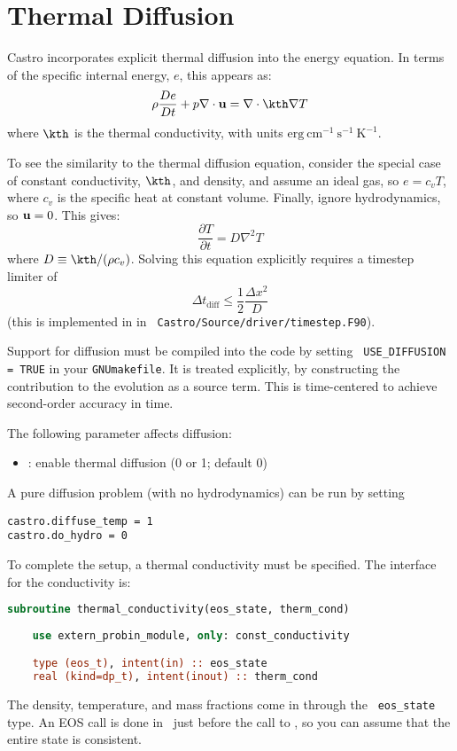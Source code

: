 \label{ch:diffusion}

\section{Thermal Diffusion}

Castro incorporates explicit thermal diffusion into the energy equation.  
In terms of the specific internal energy, $e$, this appears as:
\begin{equation}
\rho \frac{De}{Dt} + p \nabla \cdot \ub = \nabla \cdot \kth \nabla T
\end{equation}
where $\kth$ is the thermal conductivity, with units
$\mathrm{erg~cm^{-1}~s^{-1}~K^{-1}}$.

To see the similarity to the thermal diffusion equation, consider the special
case of constant conductivity, $\kth$, and density, and assume an
ideal gas, so $e = c_v T$, where $c_v$ is the specific heat at constant volume.
Finally, ignore hydrodynamics, so ${\bf u} = 0$.  This gives:
\begin{equation}
\frac{\partial T}{\partial t} = D \nabla^2 T
\end{equation}
where $D \equiv \kth/(\rho c_v)$.  Solving this equation
explicitly requires a timestep limiter of
\begin{equation}
\Delta t_\mathrm{diff} \le \frac{1}{2} \frac{\Delta x^2}{D}
\end{equation}
(this is implemented in  in {\tt
  Castro/Source/driver/timestep.F90}).

Support for diffusion must be compiled into the code by setting {\tt
  USE\_DIFFUSION = TRUE} in your {\tt GNUmakefile}.  It is treated
explicitly, by constructing the contribution to the evolution as a
source term.  This is time-centered to achieve second-order accuracy
in time.

The following parameter affects diffusion:
\begin{itemize}
\item {}:  enable thermal diffusion (0 or 1; default 0)
\end{itemize}

A pure diffusion problem (with no hydrodynamics) can be run by setting
\begin{verbatim}
castro.diffuse_temp = 1
castro.do_hydro = 0
\end{verbatim}

To complete the setup, a thermal conductivity must be specified.  The
interface for the conductivity is:
\begin{lstlisting}[language=fortran]
  subroutine thermal_conductivity(eos_state, therm_cond)
    
    use extern_probin_module, only: const_conductivity

    type (eos_t), intent(in) :: eos_state
    real (kind=dp_t), intent(inout) :: therm_cond
\end{lstlisting}
The density, temperature, and mass fractions come in through the {\tt
  eos\_state} type.  An EOS call is done in \castro\ just before the
call to , so you can assume that the entire
state is consistent.

